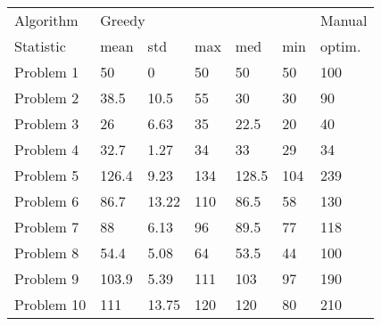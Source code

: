 \begin{tabular}{lllllll}
\toprule
Algorithm & \multicolumn{5}{l}{Greedy} & Manual \\
Statistic &   mean &    std &  max &    med &  min & optim. \\
\midrule
Problem 1  &     50 &      0 &   50 &     50 &   50 &    100 \\
Problem 2  &   38.5 &   10.5 &   55 &     30 &   30 &     90 \\
Problem 3  &     26 &   6.63 &   35 &   22.5 &   20 &     40 \\
Problem 4  &   32.7 &   1.27 &   34 &     33 &   29 &     34 \\
Problem 5  &  126.4 &   9.23 &  134 &  128.5 &  104 &    239 \\
Problem 6  &   86.7 &  13.22 &  110 &   86.5 &   58 &    130 \\
Problem 7  &     88 &   6.13 &   96 &   89.5 &   77 &    118 \\
Problem 8  &   54.4 &   5.08 &   64 &   53.5 &   44 &    100 \\
Problem 9  &  103.9 &   5.39 &  111 &    103 &   97 &    190 \\
Problem 10 &    111 &  13.75 &  120 &    120 &   80 &    210 \\
\bottomrule
\end{tabular}
